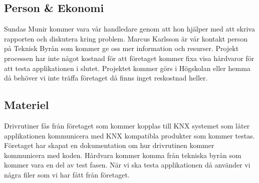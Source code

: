 \documentclass{article}
\begin{document}
\subsection{Person \& Ekonomi}
Sundas Munir kommer vara vår handledare genom att hon hjälper med att skriva rapporten och diskutera kring problem. Marcus Karlsson är vår kontakt person på Teknisk Byrån som kommer ge oss mer information och resurser. Projekt processen har inte något kostnad för att företaget kommer fixa visa hårdvaror för att testa applikationen i slutet. Projektet kommer görs i Högskolan eller hemma då behöver vi inte träffa företaget då finns inget reskostnad heller. \newline
\subsection{Materiel}
Drivrutiner fås från företaget som kommer kopplas till KNX systemet som låter applikationen kommunicera med KNX kompatibla produkter som kommer testas. Företaget har skapat en dokumentation om hur drivrutinen kommer kommunicera med koden. Hårdvara kommer komma från tekniska byrån som kommer vara en del av test fasen. När vi ska testa applikationen då använder vi några filer som vi har fått från företaget.
\end{document}

